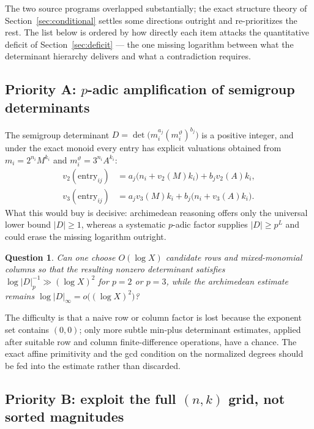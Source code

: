 \documentclass[11pt,oneside]{article}
\newtheorem{question}[theorem]{Question}
\theoremstyle{definition}
\theoremstyle{remark}
\newcommand{\thetaq}{\vartheta}
\newcommand{\vpp}[2]{v_{#1}\!\left(#2\right)}
\begin{document}
The two source programs overlapped substantially; the exact structure theory of
Section~\ref{sec:conditional} settles some directions outright and re-prioritizes the rest.
The list below is ordered by how directly each item attacks the quantitative deficit of
Section~\ref{sec:deficit} --- the one missing logarithm between what the determinant
hierarchy delivers and what a contradiction requires.

\subsection{Priority A: $p$-adic amplification of semigroup determinants}
\label{at:prog-padic}

The semigroup determinant $D=\det\bigl(m_i^{a_j}(m_i^{\thetaq})^{b_j}\bigr)$ is a positive
integer, and under the exact monoid every entry has explicit valuations obtained from
$m_i=2^{n_i}M^{k_i}$ and $m_i^{\thetaq}=3^{n_i}A^{k_i}$:
\begin{align*}
  \vpp{2}{\text{entry}_{ij}}&=a_j\bigl(n_i+\vpp{2}{M}k_i\bigr)+b_j\vpp{2}{A}k_i,\\
  \vpp{3}{\text{entry}_{ij}}&=a_j\vpp{3}{M}k_i+b_j\bigl(n_i+\vpp{3}{A}k_i\bigr).
\end{align*}
What this would buy is decisive: archimedean reasoning offers only the universal lower bound
$|D|\ge1$, whereas a systematic $p$-adic factor supplies $|D|\ge p^{L}$ and could erase the
missing logarithm outright.

\begin{question}
\label{at:q-padic}
Can one choose $O(\log X)$ candidate rows and mixed-monomial columns so that the resulting
nonzero determinant satisfies $\log|D|_p^{-1}\gg(\log X)^2$ for $p=2$ or $p=3$, while the
archimedean estimate remains $\log|D|_\infty=o\bigl((\log X)^2\bigr)$?
\end{question}

The difficulty is that a naive row or column factor is lost because the exponent set contains
$(0,0)$; only more subtle min-plus determinant estimates, applied after suitable row and
column finite-difference operations, have a chance.  The exact affine primitivity and the
gcd condition on the normalized degrees should be fed into the estimate rather than
discarded.

\subsection{Priority B: exploit the full $(n,k)$ grid, not sorted magnitudes}
\label{at:prog-grid}
\end{document}
